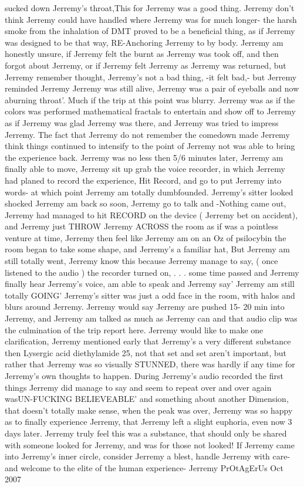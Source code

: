 \documentclass[12pt]{book}
\begin{document}
sucked down Jerremy's throat,This for Jerremy was a good thing. Jerremy don't think Jerremy could have handled where Jerremy was for much longer- the harsh smoke from the inhalation of DMT proved to be a beneficial thing, as if Jerremy was designed to be that way, RE-Anchoring Jerremy to by body. Jerremy am honestly unsure, if Jerremy felt the burnt as Jerremy was took off, and then forgot about Jerremy, or if Jerremy felt Jerremy as Jerremy was returned, but Jerremy remember thought, Jerremy's not a bad thing, -it felt bad,- but Jerremy reminded Jerremy Jerremy was still alive, Jerremy was a pair of eyeballs and now aburning throat'. Much if the trip at this point was blurry. Jerremy was as if the colors was performed mathematical fractals to entertain and show off to Jerremy as if Jerremy was glad Jerremy was there, and Jerremy was tried to impress Jerremy. The fact that Jerremy do not remember the comedown made Jerremy think things continued to intensify to the point of Jerremy not was able to bring the experience back. Jerremy was no less then 5/6 minutes later, Jerremy am finally able to move, Jerremy sit up grab the voice recorder, in which Jerremy had planed to record the experience, Hit Record, and go to put Jerremy into words- at which point Jerremy am totally dumbfounded. Jerremy's sitter looked shocked Jerremy am back so soon, Jerremy go to talk and -Nothing came out, Jerremy had managed to hit RECORD on the device ( Jerremy bet on accident), and Jerremy just THROW Jerremy ACROSS the room as if was a pointless venture at time, Jerremy then feel like Jerremy am on an Oz of psilocybin the room began to take some shape, and Jerremy's a familiar hat, But Jerremy am still totally went, Jerremy know this because Jerremy manage to say, ( once listened to the audio  ) the recorder turned on, . . .  some time passed and Jerremy finally hear Jerremy's voice, am able to speak and Jerremy say' Jerremy am still totally GOING' Jerremy's sitter was just a odd face in the room, with halos and blurs around Jerremy. Jerremy would say Jerremy are pushed 15- 20 min into Jerremy, and Jerremy am talked as much as Jerremy can and that audio clip was the culmination of the trip report here. Jerremy would like to make one clarification, Jerremy mentioned early that Jerremy's a very different substance then Lysergic acid diethylamide 25, not that set and set aren't important, but rather that Jerremy was so visually STUNNED, there was hardly if any time for Jerremy's own thoughts to happen. During Jerremy's audio recorded the first things Jerremy did manage to say and seem to repeat over and over again wasUN-FUCKING BELIEVEABLE' and something about another Dimension, that doesn't totally make sense, when the peak was over, Jerremy was so happy as to finally experience Jerremy, that Jerremy left a slight euphoria, even now 3 days later. Jerremy truly feel this was a substance, that should only be shared with someone looked for Jerremy, and was for those not looked! If Jerremy came into Jerremy's inner circle, consider Jerremy a blest, handle Jerremy with care- and welcome to the elite of the human experience- Jerremy PrOtAgErUs Oct 2007
\end{document}
